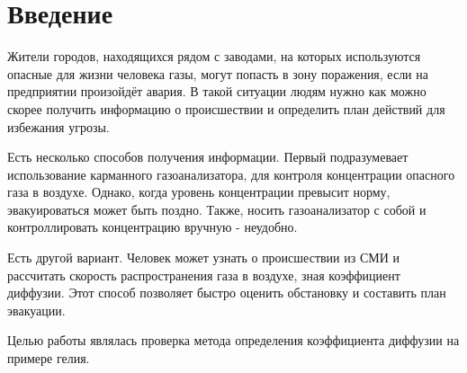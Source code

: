 \chapter{Введение}
\label{ch:intro}

Жители городов, находящихся рядом с заводами, на которых используются опасные для жизни человека газы, могут попасть в зону поражения, если на предприятии произойдёт авария. В такой ситуации людям нужно как можно скорее получить информацию о происшествии и определить план действий для избежания угрозы. 

Есть несколько способов получения информации. Первый подразумевает использование карманного газоанализатора, для контроля концентрации опасного газа в воздухе. Однако, когда уровень концентрации превысит норму, эвакуироваться может быть поздно. Также, носить газоанализатор с собой и контроллировать концентрацию вручную - неудобно.

Есть другой вариант. Человек может узнать о происшествии из СМИ и рассчитать скорость распространения газа в воздухе, зная коэффициент диффузии. Этот способ позволяет быстро оценить обстановку и составить план эвакуации.

Целью работы являлась проверка метода определения коэффициента диффузии на примере гелия.
